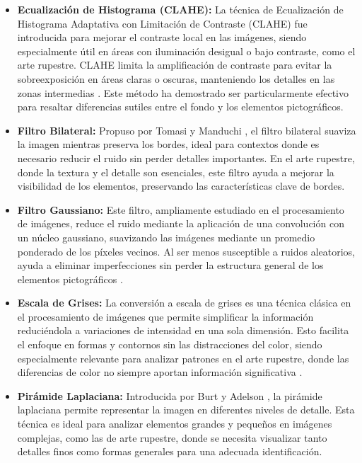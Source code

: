 \begin{itemize}
    \item \textbf{Ecualización de Histograma (CLAHE):} La técnica de Ecualización de Histograma Adaptativa con Limitación de Contraste (CLAHE) fue introducida para mejorar el contraste local en las imágenes, siendo especialmente útil en áreas con iluminación desigual o bajo contraste, como el arte rupestre. CLAHE limita la amplificación de contraste para evitar la sobreexposición en áreas claras o oscuras, manteniendo los detalles en las zonas intermedias \cite{zuiderveld1994contrast}. Este método ha demostrado ser particularmente efectivo para resaltar diferencias sutiles entre el fondo y los elementos pictográficos.

    \item \textbf{Filtro Bilateral:} Propuso por Tomasi y Manduchi \cite{tomasi1998bilateral}, el filtro bilateral suaviza la imagen mientras preserva los bordes, ideal para contextos donde es necesario reducir el ruido sin perder detalles importantes. En el arte rupestre, donde la textura y el detalle son esenciales, este filtro ayuda a mejorar la visibilidad de los elementos, preservando las características clave de bordes.

    \item \textbf{Filtro Gaussiano:} Este filtro, ampliamente estudiado en el procesamiento de imágenes, reduce el ruido mediante la aplicación de una convolución con un núcleo gaussiano, suavizando las imágenes mediante un promedio ponderado de los píxeles vecinos. Al ser menos susceptible a ruidos aleatorios, ayuda a eliminar imperfecciones sin perder la estructura general de los elementos pictográficos \cite{gonzalesWood}.

    \item \textbf{Escala de Grises:} La conversión a escala de grises es una técnica clásica en el procesamiento de imágenes que permite simplificar la información reduciéndola a variaciones de intensidad en una sola dimensión. Esto facilita el enfoque en formas y contornos sin las distracciones del color, siendo especialmente relevante para analizar patrones en el arte rupestre, donde las diferencias de color no siempre aportan información significativa \cite{gonzalesWood}.

    \item \textbf{Pirámide Laplaciana:} Introducida por Burt y Adelson \cite{burt1983laplacian}, la pirámide laplaciana permite representar la imagen en diferentes niveles de detalle. Esta técnica es ideal para analizar elementos grandes y pequeños en imágenes complejas, como las de arte rupestre, donde se necesita visualizar tanto detalles finos como formas generales para una adecuada identificación.


\end{itemize}
